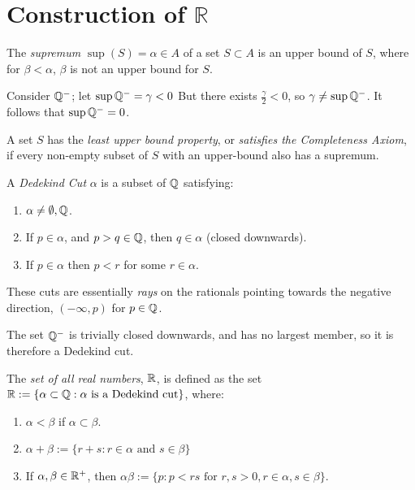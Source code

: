 \section{Construction of $\mathbb{R}$}
\begin{definition}
	The \emph{supremum} $\sup(S)=\alpha\in A$ of a set $S \subset A$ is an upper bound of $S$, where for $\beta < \alpha$, $\beta$ is not an upper bound for $S$.
\end{definition}
\begin{eg}
	Consider $\mathbb{Q}^-$; let $\sup\mathbb{Q}^-=\gamma < 0$ But there exists $ \frac{\gamma}{2}<0$, so $\gamma\neq\sup\mathbb{Q}^-$. It follows that $\sup\mathbb{Q}^-=0$.
\end{eg}
\begin{definition}
    A set $S$ has the \emph{least upper bound property}, or \emph{satisfies the Completeness Axiom}, if every non-empty subset of $S$ with an upper-bound also has a supremum.
\end{definition}
\begin{definition}
	A \emph{Dedekind Cut} $\alpha$ is a subset of $\mathbb{Q}$ satisfying:
    \begin{enumerate}
        \item $\alpha \neq \emptyset,\mathbb{Q}$.
        \item If $p\in\alpha$, and $p>q\in \mathbb{Q}$, then $q\in \alpha$ (closed downwards).
        \item If $p\in \alpha$ then $p<r$ for some $r\in\alpha$.
    \end{enumerate}
\end{definition}
These cuts are essentially \emph{rays} on the rationals pointing towards the negative direction, $(-\infty, p)$ for $p\in \mathbb{Q}$.
\begin{eg}
	The set $\mathbb{Q}^-$ is trivially closed downwards, and has no largest member, so it is therefore a Dedekind cut.
\end{eg}
\begin{definition}
	The \emph{set of all real numbers}, $\mathbb{R}$, is defined as the set $\mathbb{R}:=\{\alpha \subset \mathbb{Q}:\alpha \text{ is a Dedekind cut}\}$, where:
    \begin{enumerate}
        \item $\alpha < \beta$ if $\alpha \subset \beta$.
        \item $\alpha + \beta := \{r+s: r\in\alpha \text{ and } s\in\beta\}$
        \item If $\alpha, \beta \in \mathbb{R}^+$, then $\alpha\beta := \{p:p<rs \text{ for } r,s>0, r\in\alpha, s\in\beta\}$.
    \end{enumerate}
\end{definition}
